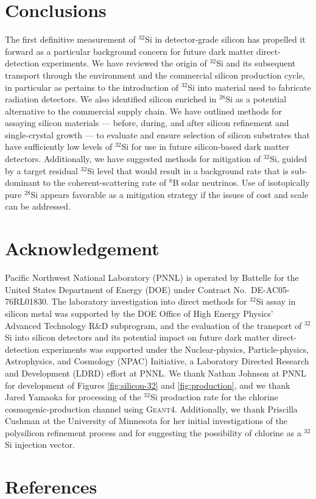 \documentclass[final,5p]{elsarticle}
\def\si{$^{32}$Si\xspace}
\def\esi{$^{28}$Si\xspace}
\begin{document}
\section{Conclusions}\label{sec:conclusions}
The first definitive measurement of \si in detector-grade silicon \cite{damic_backgrounds} has propelled it forward as a particular background concern for future  dark matter direct-detection experiments. We have reviewed the origin of \si and its subsequent transport through the environment and the commercial silicon production cycle, in particular as pertains to the introduction of \si into material used to fabricate radiation detectors. We also identified silicon enriched in \esi as a potential alternative to the commercial supply chain. We have outlined methods for assaying silicon materials --- before, during, and after silicon refinement and single-crystal growth --- to evaluate and ensure selection of silicon substrates that have sufficiently low levels of \si for use in future silicon-based dark matter detectors. Additionally, we have suggested methods for mitigation of \si, guided by a target residual \si level that would result in a background rate that is sub-dominant to the coherent-scattering rate of $^{8}$B solar neutrinos. Use of isotopically pure \esi appears favorable as a mitigation strategy if the issues of cost and scale can be addressed.  

\section*{Acknowledgement}
Pacific Northwest National Laboratory (PNNL) is operated by Battelle for the United States Department of Energy (DOE) under Contract No.\ DE-AC05-76RL01830. The laboratory investigation into direct methods for \si assay in silicon metal was supported by the DOE Office of High Energy Physics' Advanced Technology R\&D subprogram, and the evaluation of the transport of \si into silicon detectors and its potential impact on future dark matter direct-detection experiments was supported under the Nuclear-physics, Particle-physics, Astrophysics, and Cosmology (NPAC) Initiative, a Laboratory Directed Research and Development (LDRD) effort at PNNL.  We thank Nathan Johnson at PNNL for development of Figures \ref{fig:silicon-32} and \ref{fig:production}, and we thank Jared Yamaoka for processing of the \si production rate for the chlorine cosmogenic-production channel using \textsc{Geant4}. Additionally, we thank Priscilla Cushman at the University of Minnesota for her initial investigations of the polysilicon refinement process and for suggesting the possibility of chlorine as a \si injection vector.

\section*{References}

\end{document}
